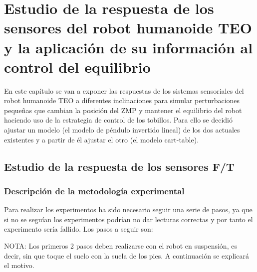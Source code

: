 \section{Estudio de la respuesta de los sensores del robot humanoide TEO y la aplicación de su información al control del equilibrio}

En este capítulo se van a exponer las respuestas de los sistemas sensoriales del robot humanoide TEO a diferentes inclinaciones  para simular perturbaciones pequeñas que cambian la posición del ZMP y mantener el equilibrio del robot haciendo uso de la estrategia de control de los tobillos. Para ello se decidió ajustar un modelo (el modelo de péndulo invertido lineal) de los dos actuales existentes y a partir de él ajustar el otro (el modelo cart-table).

\subsection{Estudio de la respuesta de los sensores F/T}

\subsubsection{Descripción de la metodología experimental}

Para realizar los experimentos ha sido necesario seguir una serie de pasos, ya que si no se seguían los experimentos podrían no dar lecturas correctas y por tanto el experimento sería fallido. Los pasos a seguir son:

NOTA: Los primeros 2 pasos deben realizarse con el robot en suspensión, es decir, sin que toque el suelo con la suela de los pies. A continuación se explicará el motivo.

